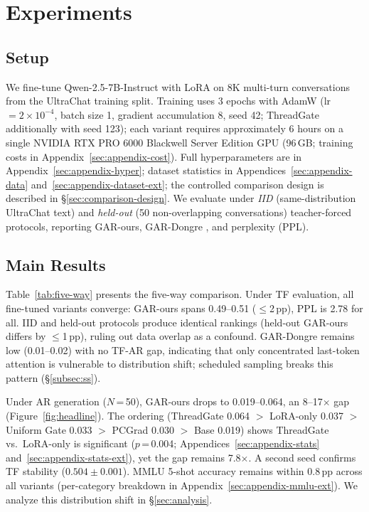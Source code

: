 \section{Experiments}
\label{sec:experiments}

\subsection{Setup}

We fine-tune Qwen-2.5-7B-Instruct with LoRA \citep{hu2022lora,dettmers2023qlora} on 8K multi-turn conversations from the UltraChat \citep{ding2023ultrachat} training split. Training uses 3 epochs with AdamW (lr $= 2 \times 10^{-4}$, batch size 1, gradient accumulation 8, seed 42; ThreadGate additionally with seed 123); each variant requires approximately 6 hours on a single NVIDIA RTX PRO 6000 Blackwell Server Edition GPU (96\,GB; training costs in Appendix~\ref{sec:appendix-cost}). Full hyperparameters are in Appendix~\ref{sec:appendix-hyper}; dataset statistics in Appendices~\ref{sec:appendix-data} and~\ref{sec:appendix-dataset-ext}; the controlled comparison design is described in \S\ref{sec:comparison-design}. We evaluate under \emph{IID} (same-distribution UltraChat text) and \emph{held-out} (50 non-overlapping conversations) teacher-forced protocols, reporting GAR-ours, GAR-Dongre \citep{dongre2026attention}, and perplexity (PPL).

\subsection{Main Results}

Table~\ref{tab:five-way} presents the five-way comparison. Under TF evaluation, all fine-tuned variants converge: GAR-ours spans 0.49--0.51 ($\leq$2\,pp), PPL is 2.78 for all. IID and held-out protocols produce identical rankings (held-out GAR-ours differs by $\leq$1\,pp), ruling out data overlap as a confound. GAR-Dongre remains low (0.01--0.02) with no TF-AR gap, indicating that only concentrated last-token attention is vulnerable to distribution shift; scheduled sampling breaks this pattern (\S\ref{subsec:ss}).

Under AR generation ($N$\,=\,50), GAR-ours drops to 0.019--0.064, an 8--17$\times$ gap (Figure~\ref{fig:headline}). The ordering (ThreadGate 0.064 $>$ LoRA-only 0.037 $>$ Uniform Gate 0.033 $>$ PCGrad 0.030 $>$ Base 0.019) shows ThreadGate vs.\ LoRA-only is significant ($p$\,=\,0.004; Appendices~\ref{sec:appendix-stats} and~\ref{sec:appendix-stats-ext}), yet the gap remains 7.8$\times$. A second seed confirms TF stability ($0.504\pm0.001$). MMLU 5-shot accuracy remains within 0.8\,pp across all variants (per-category breakdown in Appendix~\ref{sec:appendix-mmlu-ext}). We analyze this distribution shift in \S\ref{sec:analysis}.

